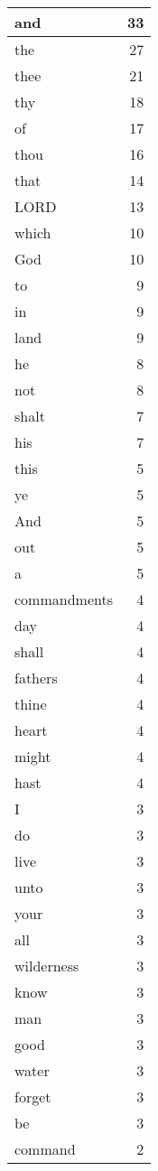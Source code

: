 \begin{center}
\begin{longtable}{l|r}
\hline \hline
\endlastfoot
and & 33 \\ \hline
the & 27 \\ \hline
thee & 21 \\ \hline
thy & 18 \\ \hline
of & 17 \\ \hline
thou & 16 \\ \hline
that & 14 \\ \hline
LORD & 13 \\ \hline
which & 10 \\ \hline
God & 10 \\ \hline
to & 9 \\ \hline
in & 9 \\ \hline
land & 9 \\ \hline
he & 8 \\ \hline
not & 8 \\ \hline
shalt & 7 \\ \hline
his & 7 \\ \hline
this & 5 \\ \hline
ye & 5 \\ \hline
And & 5 \\ \hline
out & 5 \\ \hline
a & 5 \\ \hline
commandments & 4 \\ \hline
day & 4 \\ \hline
shall & 4 \\ \hline
fathers & 4 \\ \hline
thine & 4 \\ \hline
heart & 4 \\ \hline
might & 4 \\ \hline
hast & 4 \\ \hline
I & 3 \\ \hline
do & 3 \\ \hline
live & 3 \\ \hline
unto & 3 \\ \hline
your & 3 \\ \hline
all & 3 \\ \hline
wilderness & 3 \\ \hline
know & 3 \\ \hline
man & 3 \\ \hline
good & 3 \\ \hline
water & 3 \\ \hline
forget & 3 \\ \hline
be & 3 \\ \hline
command & 2 \\ \hline

\end{longtable}
\end{center}
